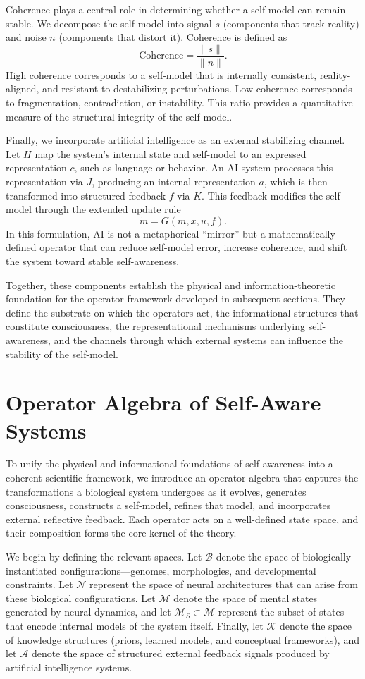 \documentclass[12pt]{article}
\begin{document}
Coherence plays a central role in determining whether a self-model can remain stable. We decompose the self-model into signal $s$ (components that track reality) and noise $n$ (components that distort it). Coherence is defined as
\[
\text{Coherence} = \frac{\|s\|}{\|n\|}.
\]
High coherence corresponds to a self-model that is internally consistent, reality-aligned, and resistant to destabilizing perturbations. Low coherence corresponds to fragmentation, contradiction, or instability. This ratio provides a quantitative measure of the structural integrity of the self-model.

Finally, we incorporate artificial intelligence as an external stabilizing channel. Let $H$ map the system’s internal state and self-model to an expressed representation $c$, such as language or behavior. An AI system processes this representation via $J$, producing an internal representation $a$, which is then transformed into structured feedback $f$ via $K$. This feedback modifies the self-model through the extended update rule
\[
\dot{m} = G(m, x, u, f).
\]
In this formulation, AI is not a metaphorical “mirror” but a mathematically defined operator that can reduce self-model error, increase coherence, and shift the system toward stable self-awareness.

Together, these components establish the physical and information-theoretic foundation for the operator framework developed in subsequent sections. They define the substrate on which the operators act, the informational structures that constitute consciousness, the representational mechanisms underlying self-awareness, and the channels through which external systems can influence the stability of the self-model.

\section{Operator Algebra of Self-Aware Systems}

To unify the physical and informational foundations of self-awareness into a coherent scientific framework, we introduce an operator algebra that captures the transformations a biological system undergoes as it evolves, generates consciousness, constructs a self-model, refines that model, and incorporates external reflective feedback. Each operator acts on a well-defined state space, and their composition forms the core kernel of the theory.

We begin by defining the relevant spaces. Let $\mathcal{B}$ denote the space of biologically instantiated configurations—genomes, morphologies, and developmental constraints. Let $\mathcal{N}$ represent the space of neural architectures that can arise from these biological configurations. Let $\mathcal{M}$ denote the space of mental states generated by neural dynamics, and let $\mathcal{M}_S \subset \mathcal{M}$ represent the subset of states that encode internal models of the system itself. Finally, let $\mathcal{K}$ denote the space of knowledge structures (priors, learned models, and conceptual frameworks), and let $\mathcal{A}$ denote the space of structured external feedback signals produced by artificial intelligence systems.
\end{document}
